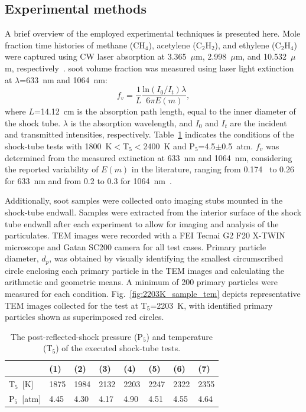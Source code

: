 \subsection{Experimental methods}
A brief overview of the employed experimental techniques is presented here. Mole fraction time histories of methane ($\mathrm{CH_4}$), acetylene ($\mathrm{C_2H_2}$), and ethylene ($\mathrm{C_2H_4}$) were captured using CW laser absorption at 3.365~$\mu$m, 2.998~$\mu$m, and 10.532~$\mu$m, respectively~\citep{stranic2014laser,pinkowski2019multi,cassady2020thermal}. soot volume fraction was measured using laser light extinction at $\lambda$=633~nm and 1064~nm:
\begin{equation}
f_v=\frac{1}{L}\frac{\mathrm{ln}(I_0/I_t)\lambda}{6\pi E(m)},
\label{eqn:fvext}
\end{equation}
\noindent where $L$=14.12~cm is the absorption path length, equal to the inner diameter of the shock tube. $\lambda$ is the absorption wavelength, and $I_0$ and $I_t$ are the incident and transmitted intensities, respectively. Table~\ref{tab:TP5_exec_tests} indicates the conditions of the shock-tube tests with 1800~K$<$T$_5$$<$2400~K and P$_5$=4.5$\pm$0.5~atm. $f_v$ was determined from the measured extinction at 633~nm and 1064~nm, considering the reported variability of $E(m)$ in the literature, ranging from 0.174~\citep{lee1981optical} to 0.26~\citep{dalzell1969optical} for 633~nm and from 0.2 to 0.3 for 1064~nm~\citep{bladh2011optical}.

Additionally, soot samples were collected onto imaging stubs mounted in the shock-tube endwall. Samples were extracted from the interior surface of the shock tube endwall after each experiment to allow for imaging and analysis of the particulates. TEM images were recorded with a FEI Tecnai G2 F20 X-TWIN microscope and Gatan SC200 camera for all test cases. Primary particle diameter, $d_p$, was obtained by visually identifying the smallest circumscribed circle enclosing each primary particle in the TEM images and calculating the arithmetic and geometric means. A minimum of 200 primary particles were measured for each condition. Fig.~\ref{fig:2203K_sample_tem} depicts representative TEM images collected for the test at T$_5$=2203~K, with identified primary particles shown as superimposed red circles.


\renewcommand{\arraystretch}{1.5}
\begin{table}[!t]
	\centering
	\caption{The post-reflected-shock pressure (P$_5$) and temperature (T$_5$) of the executed shock-tube tests.}
	\label{tab:TP5_exec_tests}
    \begin{tabular}{llllllll}
    \hline
     & (1)  & (2)  & (3)  & (4)  & (5)  & (6)  & (7)  \\ \hline
    T$_5$~[K]   & 1875 & 1984 & 2132 & 2203 & 2247 & 2322 & 2355 \\ \hline
    P$_5$~[atm] & 4.45 & 4.30 & 4.17 & 4.90 & 4.51 & 4.55 & 4.64 \\ \hline
    \end{tabular}
\end{table}


